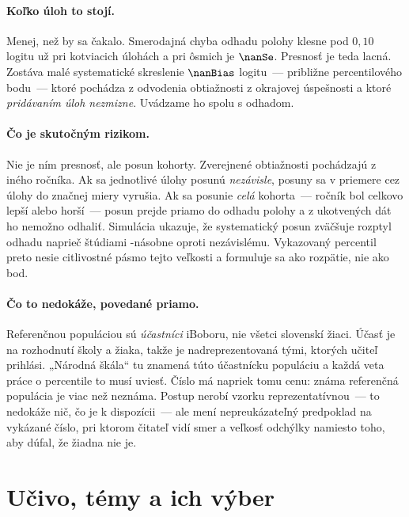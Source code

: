 \paragraph{Koľko úloh to stojí.} Menej, než by sa čakalo. Smerodajná chyba odhadu polohy klesne pod $0{,}10$ logitu už pri \nanItemsNeeded{} kotviacich úlohách a pri ôsmich je $\nanSe$. Presnosť je teda lacná. Zostáva malé systematické skreslenie $\nanBias$ logitu~--- približne \nanBiasPct{} percentilového bodu~--- ktoré pochádza z odvodenia obtiažnosti z okrajovej úspešnosti a ktoré \emph{pridávaním úloh nezmizne}. Uvádzame ho spolu s odhadom.

\paragraph{Čo je skutočným rizikom.} Nie je ním presnosť, ale posun kohorty. Zverejnené obtiažnosti pochádzajú z iného ročníka. Ak sa jednotlivé úlohy posunú \emph{nezávisle}, posuny sa v priemere cez úlohy do značnej miery vyrušia. Ak sa posunie \emph{celá} kohorta~--- ročník bol celkovo lepší alebo horší~--- posun prejde priamo do odhadu polohy a z ukotvených dát ho nemožno odhaliť. Simulácia ukazuje, že systematický posun zväčšuje rozptyl odhadu naprieč štúdiami \nanDriftRatio-násobne oproti nezávislému. Vykazovaný percentil preto nesie citlivostné pásmo tejto veľkosti a formuluje sa ako rozpätie, nie ako bod.

\paragraph{Čo to nedokáže, povedané priamo.} Referenčnou populáciou sú \emph{účastníci} iBoboru, nie všetci slovenskí žiaci. Účasť je na rozhodnutí školy a žiaka, takže je nadreprezentovaná tými, ktorých učiteľ prihlási. „Národná škála“ tu znamená túto účastnícku populáciu a každá veta práce o percentile to musí uviesť. Číslo má napriek tomu cenu: známa referenčná populácia je viac než neznáma. Postup nerobí vzorku reprezentatívnou~--- to nedokáže nič, čo je k dispozícii~--- ale mení nepreukázateľný predpoklad na vykázané číslo, pri ktorom čitateľ vidí smer a veľkosť odchýlky namiesto toho, aby dúfal, že žiadna nie je.


\section{Učivo, témy a ich výber}
\label{sec:temy}


